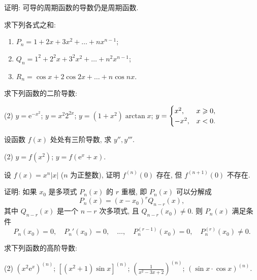 \begin{exercise}[3.1.16]
    证明: 可导的周期函数的导数仍是周期函数.
\end{exercise}

\begin{exercise}[3.1.17]
    求下列各式之和:
    \begin{enumerate}
        \item $P_n=1+2x+3x^2+\dots+nx^{n-1}$;
        \item $Q_n=1^2+2^2x+3^2x^2+\dots+n^2x^{n-1}$;
        \item $R_n = \cos x + 2\cos 2x + \dots + n\cos nx$.
    \end{enumerate}
\end{exercise}

\begin{exercise}[3.1.18]
    求下列函数的二阶导数:
    \begin{tasks}[label=(\arabic*)](2)
        \task $y = \mathrm{e}^{-x^2}$;
        \task $y = x^2 2^{2x}$;
        \task $y = (1+x^2)\arctan x$;
        \task $y = \begin{cases} x^2, & x \geqslant 0, \\ -x^2, & x < 0. \end{cases}$
    \end{tasks}
\end{exercise}

\begin{exercise}[3.1.19]
    设函数 $f(x)$ 处处有三阶导数, 求 $y'', y'''$.
    \begin{tasks}[label=(\arabic*)](2)
        \task $y=f(x^2)$;
        \task $y=f(\mathrm{e}^x+x)$.
    \end{tasks}
\end{exercise}

\begin{exercise}[3.1.20]
    设 $f(x)=x^n|x|$ ($n$ 为正整数), 证明 $f^{(n)}(0)$ 存在, 但 $f^{(n+1)}(0)$ 不存在.
\end{exercise}

\begin{exercise}[3.1.21]
    证明: 如果 $x_0$ 是多项式 $P_n(x)$ 的 $r$ 重根, 即 $P_n(x)$ 可以分解成
    $$ P_n(x) = (x-x_0)^r Q_{n-r}(x), $$
    其中 $Q_{n-r}(x)$ 是一个 $n-r$ 次多项式, 且 $Q_{n-r}(x_0) \ne 0$. 则 $P_n(x)$ 满足条件
    $$ P_n(x_0)=0, \quad P_n'(x_0)=0, \quad \dots, \quad P_n^{(r-1)}(x_0)=0, \quad P_n^{(r)}(x_0) \ne 0. $$
\end{exercise}

\begin{exercise}[3.1.22]
    求下列函数的高阶导数:
    \begin{tasks}[label=(\arabic*)](2)
        \task $(x^2\mathrm{e}^x)^{(n)}$;
        \task $[(x^2+1)\sin x]^{(n)}$;
        \task $\left(\frac{1}{x^2-3x+2}\right)^{(n)}$;
        \task $(\sin x \cdot \cos x)^{(n)}$.
    \end{tasks}
\end{exercise}

